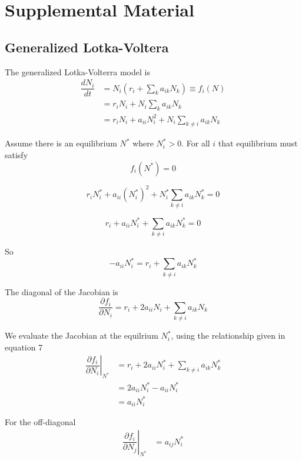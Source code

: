 \documentclass{article}
\begin{document}
\section*{Supplemental Material}

\subsection*{Generalized Lotka-Voltera}

The generalized Lotka-Volterra model is
\begin{align}
\dfrac{dN_i}{dt} &= N_i\left(r_i + \sum_k a_{ik}N_k\right) \equiv f_i(N)\\
&=r_iN_i + N_i\sum_k a_{ik}N_k \\
&=r_iN_i + a_{ii} N_i^2 + N_i \sum_{k\neq i} a_{ik}N_k
\end{align}

Assume there is an equilibrium $N^*$ where $N^*_i>0$. For all $i$ that equilibrium must satisfy
\begin{equation}
f_i(N^*) = 0
\end{equation}

\begin{equation}
r_iN^*_i + a_{ii} (N^*_i)^2 + N^*_i \sum_{k\neq i} a_{ik}N^*_k = 0
\end{equation}

\begin{equation}
r_i + a_{ii} N^*_i + \sum_{k\neq i} a_{ik}N^*_k = 0 
\end{equation}

So 
\begin{equation}
-a_{ii} N^*_i = r_i + \sum_{k\neq i} a_{ik}N^*_k
\end{equation}

The diagonal of the Jacobian is
\begin{equation}
\dfrac{\partial f_i}{\partial N_i} = r_i + 2a_{ii} N_i + \sum_{k\neq i} a_{ik}N_k
\end{equation}

We evaluate the Jacobian at the equilrium $N_i^*$, using the relationship given in equation 7
\begin{align}
    \left.\dfrac{\partial f_i}{\partial N_i} \right \rvert_{N^*} 
    &= r_i + 2a_{ii} N^*_i + \sum_{k\neq i} a_{ik}N^*_k \\
    &= 2a_{ii} N^*_i - a_{ii}N^*_i \\ 
    &= a_{ii} N^*_i
\end{align}

For the off-diagonal
\begin{align}
    \left.\dfrac{\partial f_i}{\partial N_j} \right \rvert_{N^*} 
    &=a_{ij} N^*_i
\end{align}
\end{document}
